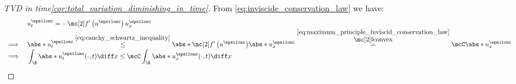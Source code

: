 \begin{proofbox}\nospacing
    \begin{proof}[TVD in time\cref{cor:total_variation_diminishing_in_time}]\label{proof:cor:total_variation_diminishing_in_time}
        From \cref{eq:inviscide_conservation_law} we have:
        \begin{align*}
          &&&u_{t}^{\epsilonc}=-\flux'\left(u^{\epsilonc}\right)u_{x}^{\epsilonc}\\[-1\jot]
          &\implies&&\abs*{u_{t}^{\epsilonc}}\stackrel{\cref{eq:cauchy_schwartz_inequality}}{\leq}\abs*{\flux'\left(u^{\epsilonc}\right)}\abs*{u_{x}^{\epsilonc}}
            \stackrel{\substack{\cref{eq:maximum_principle_inviscid_conservation_law}\\ $\flux$ \text{convex}}}{=}\mcC\abs*{u_{x}^{\epsilonc}}\\[-1\jot]
          &\implies&&\int_{\R}\abs*{u_{t}^{\epsilonc}(\cdot,t)}\diff x\leq\mcC\int_{\R}\abs*{u_{x}^{\epsilonc}(\cdot,t)}\diff x
        \end{align*}
    \end{proof}
\end{proofbox}

